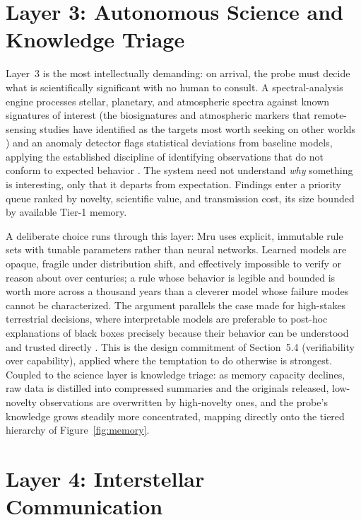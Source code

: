 \documentclass[10pt, a4paper]{article}
\begin{document}
\section{Layer 3: Autonomous Science and Knowledge Triage}

Layer~3 is the most intellectually demanding: on arrival, the probe must decide what is scientifically significant with no human to consult. A spectral-analysis engine processes stellar, planetary, and atmospheric spectra against known signatures of interest (the biosignatures and atmospheric markers that remote-sensing studies have identified as the targets most worth seeking on other worlds \cite{desmarais2002}) and an anomaly detector flags statistical deviations from baseline models, applying the established discipline of identifying observations that do not conform to expected behavior \cite{chandola2009}. The system need not understand \textit{why} something is interesting, only that it departs from expectation. Findings enter a priority queue ranked by novelty, scientific value, and transmission cost, its size bounded by available Tier-1 memory.

A deliberate choice runs through this layer: Mru uses explicit, immutable rule sets with tunable parameters rather than neural networks. Learned models are opaque, fragile under distribution shift, and effectively impossible to verify or reason about over centuries; a rule whose behavior is legible and bounded is worth more across a thousand years than a cleverer model whose failure modes cannot be characterized. The argument parallels the case made for high-stakes terrestrial decisions, where interpretable models are preferable to post-hoc explanations of black boxes precisely because their behavior can be understood and trusted directly \cite{rudin2019}. This is the design commitment of Section~5.4 (verifiability over capability), applied where the temptation to do otherwise is strongest. Coupled to the science layer is knowledge triage: as memory capacity declines, raw data is distilled into compressed summaries and the originals released, low-novelty observations are overwritten by high-novelty ones, and the probe's knowledge grows steadily more concentrated, mapping directly onto the tiered hierarchy of Figure~\ref{fig:memory}.

\section{Layer 4: Interstellar Communication}
\end{document}
